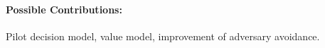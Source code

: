 \documentclass[a4paper,narrowmargins,11pt,oneside,onehalfspaced,singlespacednotes]{fcup-thesis}
\theoremstyle{plain}
\theoremstyle{plain}
\theoremstyle{remark}
\begin{document}
\paragraph{Possible Contributions:} Pilot decision model, value model, improvement of adversary avoidance.


	
%


\end{document}
